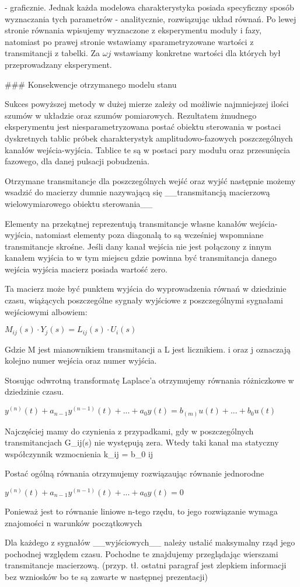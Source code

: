 \documentclass{article}
\begin{document}
	- graficznie. Jednak każda modelowa charakterystyka posiada specyficzny sposób wyznaczania
	tych parametrów
	- analitycznie, rozwiązując układ równań. Po lewej stronie równania wpisujemy
	wyznaczone z eksperymentu moduły i fazy, natomiast po prawej stronie wstawiamy
	sparametryzowane wartości z transmitancji z tabelki. Za $\omega j$ wstawiamy
	konkretne wartości dla których był przeprowadzany eksperyment.

	### Konsekwencje otrzymanego modelu stanu

	Sukces powyższej metody w dużej mierze zależy od możliwie najmniejszej ilości
	szumów w układzie oraz szumów pomiarowych. Rezultatem żmudnego eksperymentu
	jest niesparametryzowana postać obiektu sterowania w postaci dyskretnych tablic
	próbek charakterystyk amplitudowo-fazowych poszczególnych kanałów wejścia-wyjścia.
	Tablice te są w postaci pary modułu oraz przesunięcia fazowego, dla danej pulsacji
	pobudzenia.

	Otrzymane transmitancje dla poszczególnych wejść oraz wyjść następnie możemy
	wsadzić do macierzy dumnie nazywającą się __transmitancją macierzową
	wielowymiarowego obiektu sterowania__

	Elementy na przekątnej reprezentują transmitancje własne kanałów
	wejścia-wyjścia, natomiast elementy poza diagonalą to są
	wcześniej wspomniane transmitancje skrośne. Jeśli dany kanał wejścia nie jest
	połączony z innym kanałem wyjścia to w tym miejscu gdzie powinna być
	transmitancja danego wejścia wyjścia macierz posiada wartość zero.

	Ta macierz może być punktem wyjścia do wyprowadzenia równań w dziedzinie czasu,
	wiążących poszczególne sygnały wyjściowe z poszczególnymi sygnałami wejściowymi albowiem:

	$ M_{ij}(s) \cdot Y_{j}(s) = L_{ij}(s) \cdot U_{i}(s) $

	Gdzie M jest mianownikiem transmitancji a L jest licznikiem.
	i oraz j oznaczają kolejno numer wejścia oraz numer wyjścia.

	Stosując odwrotną transformatę Laplace'a otrzymujemy równania różniczkowe w
	dziedzinie czasu.

	$ y^{(n)}(t) + a_{n-1} y^{(n-1)}(t) + ... +   a_{0} y(t) = b_{(m)} u(t) + ... + b_{0} u(t) $

	Najczęściej mamy do czynienia z przypadkami, gdy w poszczególnych
	transmitancjach G_{ij}(s) nie występują zera.
	Wtedy taki kanał ma statyczny współczynnik wzmocnienia k_{ij} = b_{0 ij}

	Postać ogólną równania otrzymujemy rozwiązaując równanie jednorodne

	$ y^{(n)}(t) + a_{n-1} y^{(n-1)}(t) + ... +   a_{0} y(t) = 0 $

	Ponieważ jest to równanie liniowe n-tego rzędu, to jego rozwiązanie wymaga znajomości
	n warunków początkowych

	Dla każdego z sygnałów __wyjściowych__ należy ustalić maksymalny rząd jego
	pochodnej względem czasu. Pochodne te znajdujemy przeglądając wierszami
	transmitancje macierzową.
	(przyp. tł. ostatni paragraf jest zlepkiem informacji bez wzniosków bo te
	są zawarte w następnej prezentacji)
\end{document}

